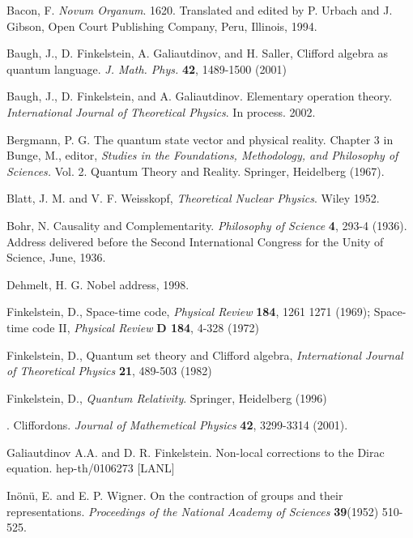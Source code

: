 \documentclass[a4paper,11pt]{article}
\begin{document}
\begin{thebibliography}{XXX}

 Bacon, F.   {\em Novum Organum}\/. 1620. 
Translated and edited by P.  Urbach and J. Gibson, 
Open Court Publishing Company, Peru, Illinois, 1994.  


 Baugh, J., D. Finkelstein, A. Galiautdinov, and H.
Saller, Clifford algebra as quantum language. 
{\it J. Math. Phys.} {\bf 42}, 1489-1500 (2001)

 Baugh, J., D. Finkelstein, and A. Galiautdinov.
Elementary operation theory.
{\em International Journal of Theoretical Physics}\/. In process. 2002.


 Bergmann, P. G. The quantum state vector and physical reality.  
Chapter 3 in Bunge, M., editor, 
{\em Studies in the Foundations, Methodology, and Philosophy of Sciences.}
Vol. 2. Quantum Theory and Reality. Springer, Heidelberg (1967).

 Blatt, J. M. and V. F. Weisskopf, {\em Theoretical Nuclear Physics}\/.  
Wiley 1952.

 Bohr, N.  
Causality and Complementarity.
{\em Philosophy of Science} {\bf 4},  293-4 (1936).
Address delivered before the
Second International Congress for the Unity of Science, June, 1936.


 Dehmelt, H. G. Nobel address, 1998.

Finkelstein, D., Space-time code, {\it Physical Review}\/
{\bf 184}, 1261 1271 (1969); Space-time code II, {\it
Physical Review}\/ {\bf D 184}, 4-328 (1972)

Finkelstein, D., Quantum set theory and
Clifford algebra,  {\it International Journal of Theoretical
Physics}\/ {\bf 21}, 489-503 (1982)

Finkelstein, D., {\it Quantum Relativity}\/. 
Springer,
Heidelberg (1996)

.  
Cliffordons. 
{\em Journal of Mathemetical Physics} {\bf 42}, 3299-3314 (2001).

Galiautdinov A.A. and D. R. Finkelstein.
 Non-local corrections to the Dirac equation. hep-th/0106273 [LANL]

 In\"on\"u, E. and E. P. Wigner.
On the contraction of groups and their representations.
{\it Proceedings of the National Academy of Sciences} {\bf
39}(1952) 510-525. 


\end{thebibliography}
\end{document}
